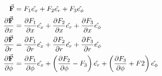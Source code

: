 \begin{equation}
  \begin{aligned}
    \va{F} &= F_1\hat{e_x} + F_2\hat{e_r} + F_3\hat{e_\phi} \\
    \pdv{\va{F}}{x} &= 
    \pdv{F_1}{x}\hat{e_x} + 
    \pdv{F_2}{x}\hat{e_r} + 
    \pdv{F_3}{x}\hat{e_\phi} \\
    \pdv{\va{F}}{r} &= 
    \pdv{F_1}{r}\hat{e_x} + 
    \pdv{F_2}{r}\hat{e_r} + 
    \pdv{F_3}{r}\hat{e_\phi} \\
    \pdv{\va{F}}{\phi} &= 
    \pdv{F_1}{\phi}\hat{e_x} + 
    \left(\pdv{F_2}{\phi} - F_3\right)\hat{e_r} + 
    \left(\pdv{F_3}{\phi} + F2\right)\hat{e_\phi}
  \end{aligned}
\end{equation}
